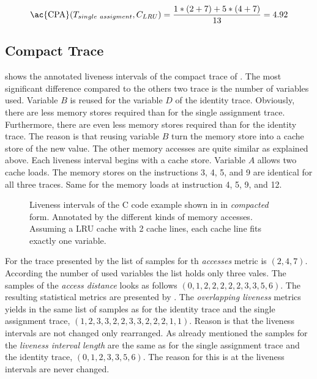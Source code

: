 \documentclass[onecolumn, openright, master, english, signatures]{dbrgrptt}
\begin{document}
\begin{equation}\label{equ:trace-transformation-sa-marked}
\text{\ac{CPA}}(T_{single~assigment}, C_{LRU}) = \frac{1 * (2 + 7) + 5 * (4 + 7)}{13} = 4.92
\end{equation}

\subsection{Compact Trace}
 shows the annotated liveness intervals of the compact trace of . The most significant difference compared to the others two trace is the number of variables used. Variable $B$ is reused for the variable $D$ of the identity \ac{trace}. Obviously, there are less memory stores required than for the single assignment trace. Furthermore, there are even less memory stores required than for the identity \ac{trace}. The reason is that reusing variable $B$ turn the memory store into a cache store of the new value. The other memory accesses are quite similar as explained above. Each liveness interval begins with a cache store. Variable $A$ allows two cache loads. The memory stores on the instructions 3, 4, 5, and 9 are identical for all three traces. Same for the memory loads at instruction 4, 5, 9, and 12.

\begin{figure}
  \centering
  
  \caption{Liveness intervals of the C code example shown in  in \emph{compacted} form. Annotated by the different kinds of memory accesses. Assuming a \ac{LRU} cache with 2 cache lines, each cache line fits exactly one variable.}
  \label{fig:trace-transformation-compact-marked}
\end{figure}

For the \ac{trace} presented by  the list of samples for th \emph{accesses} metric is $(2, 4, 7)$. According the number of used variables the list holds only three vales. The samples of the \emph{access distance} looks as follows $(0, 1, 2, 2, 2, 2, 2, 3, 3, 5, 6)$. The resulting statistical metrics are presented by . The \emph{overlapping liveness} metrics yields in the same list of samples as for the identity \ac{trace} and the single assignment \ac{trace}, $(1, 2, 3, 3, 2, 2, 3, 3, 2, 2, 2, 1, 1)$. Reason is that the liveness intervals are not changed only rearranged. As already mentioned the samples for the \emph{liveness interval length} are the same as for the single assignment \ac{trace} and the identity \ac{trace}, $(0, 1, 2, 3, 3, 5, 6)$. The reason for this is at the liveness intervals are never changed.
\end{document}
